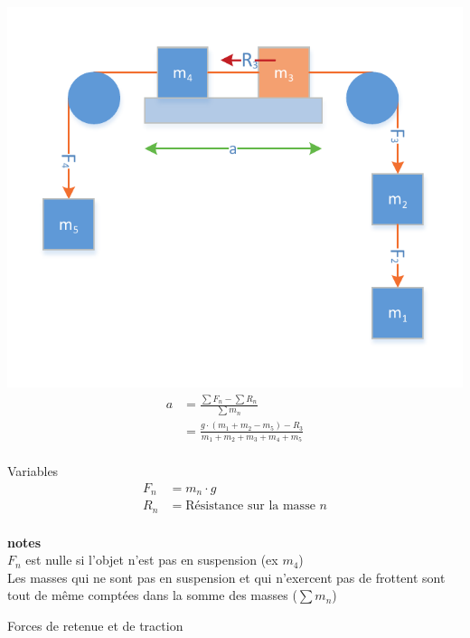 \documentclass[12pt,a4paper]{article} %
\begin{document}
\begin{twocols}[0.5][0.5]
	\includegraphics[width=1\textwidth]{Newton-Poulies}
\nextcol
	\begin{align*}
		a &= \frac{\sum F_n - \sum R_n}{\sum m_n} \\
		  &= \frac{g\cdot(m_1+m_2-m_5) - R_3}{m_1+m_2+m_3+m_4+m_5} \\
	\end{align*}
	\par\vspace{0.2em}
	Variables \\
	\begin{align*}
		F_n &= m_n \cdot g \\
		R_n &= \text{Résistance sur la masse $n$} \\
	\end{align*}
	\par\vspace{0.2em}
	{\small
	\textbf{notes} \\
	$F_n$ est nulle si l'objet n'est pas en suspension (ex $m_4$) \\
	Les masses qui ne sont pas en suspension et qui n'exercent pas de frottent sont tout de même comptées dans la somme des masses ($\sum m_n$)
	}

\end{twocols}
Forces de retenue et de traction \\
\end{document}
